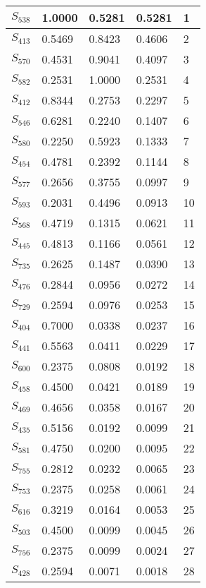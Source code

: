 \begin{xltabular}{\textwidth}{|X|X|X|X|X|}
        \hline
        \endlastfoot
    $S_{538}$ & 1.0000 & 0.5281 & 0.5281 & 1 \\ \hline
 $S_{413}$ & 0.5469 & 0.8423 & 0.4606 & 2 \\ \hline
 $S_{570}$ & 0.4531 & 0.9041 & 0.4097 & 3 \\ \hline
 $S_{582}$ & 0.2531 & 1.0000 & 0.2531 & 4 \\ \hline
 $S_{412}$ & 0.8344 & 0.2753 & 0.2297 & 5 \\ \hline
 $S_{546}$ & 0.6281 & 0.2240 & 0.1407 & 6 \\ \hline
 $S_{580}$ & 0.2250 & 0.5923 & 0.1333 & 7 \\ \hline
 $S_{454}$ & 0.4781 & 0.2392 & 0.1144 & 8 \\ \hline
 $S_{577}$ & 0.2656 & 0.3755 & 0.0997 & 9 \\ \hline
 $S_{593}$ & 0.2031 & 0.4496 & 0.0913 & 10 \\ \hline
 $S_{568}$ & 0.4719 & 0.1315 & 0.0621 & 11 \\ \hline
 $S_{445}$ & 0.4813 & 0.1166 & 0.0561 & 12 \\ \hline
 $S_{735}$ & 0.2625 & 0.1487 & 0.0390 & 13 \\ \hline
 $S_{476}$ & 0.2844 & 0.0956 & 0.0272 & 14 \\ \hline
 $S_{729}$ & 0.2594 & 0.0976 & 0.0253 & 15 \\ \hline
 $S_{404}$ & 0.7000 & 0.0338 & 0.0237 & 16 \\ \hline
 $S_{441}$ & 0.5563 & 0.0411 & 0.0229 & 17 \\ \hline
 $S_{600}$ & 0.2375 & 0.0808 & 0.0192 & 18 \\ \hline
 $S_{458}$ & 0.4500 & 0.0421 & 0.0189 & 19 \\ \hline
 $S_{469}$ & 0.4656 & 0.0358 & 0.0167 & 20 \\ \hline
 $S_{435}$ & 0.5156 & 0.0192 & 0.0099 & 21 \\ \hline
 $S_{581}$ & 0.4750 & 0.0200 & 0.0095 & 22 \\ \hline
 $S_{755}$ & 0.2812 & 0.0232 & 0.0065 & 23 \\ \hline
 $S_{753}$ & 0.2375 & 0.0258 & 0.0061 & 24 \\ \hline
 $S_{616}$ & 0.3219 & 0.0164 & 0.0053 & 25 \\ \hline
 $S_{503}$ & 0.4500 & 0.0099 & 0.0045 & 26 \\ \hline
 $S_{756}$ & 0.2375 & 0.0099 & 0.0024 & 27 \\ \hline
 $S_{428}$ & 0.2594 & 0.0071 & 0.0018 & 28 \\ \hline
    \end{xltabular}
    